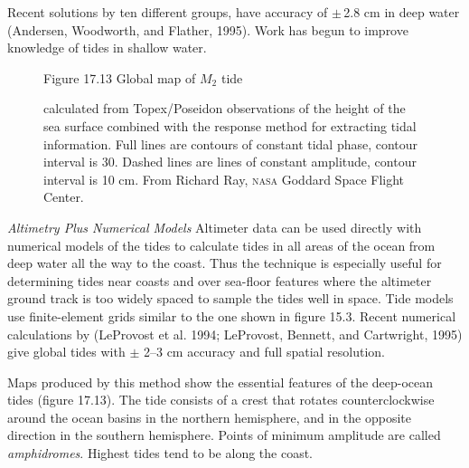 Recent solutions by ten different groups, have
accuracy of $\pm \, $2.8 cm in deep water
(Andersen, Woodworth, and Flather, 1995). Work has begun to improve
knowledge of tides in shallow water.

\begin{figure}[t!]
\footnotesize
Figure 17.13 Global map of $M_2$ tide \rule{0mm}{4ex}calculated from
Topex/Poseidon observations of the
height of the sea surface combined with the response method for
extracting tidal information.  Full lines are contours of constant
tidal phase, contour interval is 30\degrees. Dashed lines are lines of
constant amplitude, contour interval is 10 cm. From Richard Ray,
\textsc{nasa} Goddard Space Flight Center.
\label{fig:m2_tide}
\vspace{-3ex}
\end{figure}

\textit{Altimetry Plus Numerical Models} Altimeter data can be used
directly with 
 numerical models of the tides to calculate
tides in all areas of the ocean from deep water all the way to the
coast. Thus the technique is especially useful for determining tides
near coasts and over sea-floor features where the altimeter ground
track is too widely spaced to sample the tides well in space. Tide
models use finite-element grids similar to the one shown in figure
15.3. Recent numerical calculations by (LeProvost et al. 1994;
LeProvost, Bennett, and Cartwright, 1995) give global tides with $\pm$
2--3 cm accuracy and full spatial resolution.

Maps produced by this method show the essential features of the
deep-ocean tides (figure 17.13). The tide consists of a crest that
rotates counterclockwise around the ocean basins in the northern
hemisphere, and in the opposite direction in the southern
hemisphere. Points of minimum amplitude are called
\textit{amphidromes}.
Highest tides tend to be along the coast.

